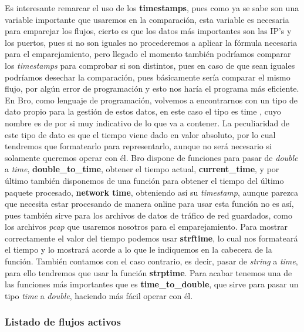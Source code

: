 Es interesante remarcar el uso de los \textbf{timestamps}, pues como ya se sabe son una 
variable importante que usaremos en la comparación, esta variable es necesaria para emparejar 
los flujos, cierto es que los datos más importantes son las IP’s y los puertos, 
pues si no son iguales no procederemos a aplicar la fórmula necesaria para el 
emparejamiento, pero llegado el momento también podríamos comparar los \textit{timestamps} 
para comprobar si son distintos, pues en caso de que sean iguales podríamos desechar la 
comparación, pues básicamente sería comparar el mismo flujo, por algún error de programación 
y esto nos haría el programa más eficiente.
\intro
En Bro, como lenguaje de programación, volvemos a encontrarnos con un tipo de 
dato propio para la gestión de estos datos, en este caso el tipo es time \cite{timetype}, 
cuyo nombre es de por si muy indicativo de lo que va a contener. La peculiaridad 
de este tipo de dato es que el tiempo viene dado en valor absoluto, por lo cual 
tendremos que formatearlo para representarlo, aunque no será necesario si solamente 
queremos operar con él. Bro dispone de funciones para pasar de \textit{double} a 
\textit{time}, \textbf{double\_to\_time}, 
obtener el tiempo actual, \textbf{current\_time}, y por último también disponemos de una 
función para obtener el tiempo del último paquete procesado, \textbf{network time}, 
obteniendo así su \textit{timestamp}, aunque parezca que necesita estar procesando de 
manera online para usar esta función no es así, pues también sirve para los 
archivos de datos de tráfico de red guardados, como los archivos \textit{pcap} que 
usaremos nosotros para el emparejamiento. Para mostrar correctamente el valor 
del tiempo podemos usar \textbf{strftime}, lo cual nos formateará el tiempo y lo mostrará 
acorde a lo que le indiquemos en la cabecera de la función. También contamos con el 
caso contrario, es decir, pasar de \textit{string} a \textit{time}, para ello tendremos que usar la 
función \textbf{strptime}.
\intro
Para acabar tenemos una de las funciones más importantes que es \textbf{time\_to\_double}, que sirve para pasar 
un tipo \textit{time} a \textit{double}, haciendo más fácil operar con él.

\subsubsection{Listado de flujos activos}

